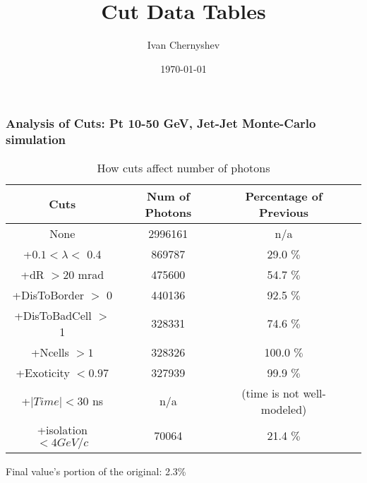 \documentclass{beamer}
\title{Cut Data Tables}
\author{Ivan Chernyshev}
\date{\today}
\begin{document}
 

\frame 
{ 
\frametitle{Analysis of Cuts: Pt 10-50 GeV, Jet-Jet Monte-Carlo simulation} 
\begin{table} 
\caption{How cuts affect number of photons} 
\centering 
\begin{tabular}{c c c c} 
\hline\hline 
Cuts & Num of Photons & Percentage of Previous\\ [0.5ex] 
\hline
None & 2996161 & n/a\\
+$0.1 < \lambda <$ 0.4 & 869787 & 29.0 $\%$ \\
+dR $> 20$ mrad & 475600 & 54.7 $\%$ \\
+DisToBorder $>$ 0 & 440136 & 92.5 $\%$ \\
+DisToBadCell $>$ 1 & 328331 & 74.6 $\%$ \\
+Ncells $> 1$ & 328326 & 100.0 $\%$ \\
+Exoticity $< 0.97$ & 327939 & 99.9 $\%$ \\
+$|Time| < 30$ ns & n/a & (time is not well-modeled)  \\
+isolation $< 4 GeV/c$ & 70064 & 21.4 $\%$ \\
[1ex] 
\hline 
\end{tabular} 
\label{table:nonlin} 
\end{table} 
 Final value's portion of the original: 2.3\%
 } 
\end{document}
